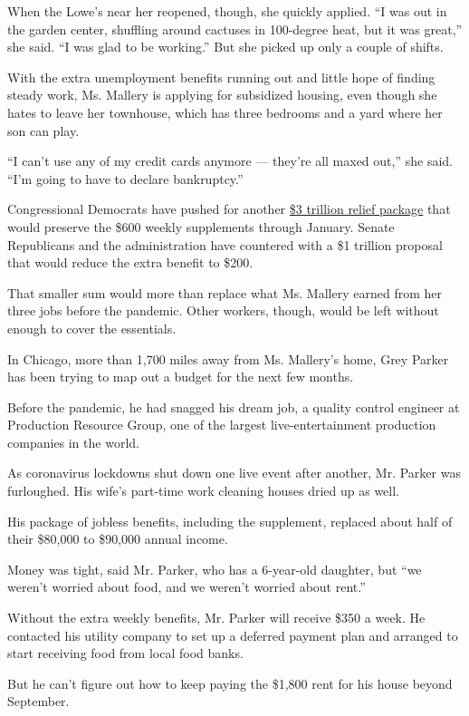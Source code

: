 When the Lowe's near her reopened, though, she quickly applied. ``I was
out in the garden center, shuffling around cactuses in 100-degree heat,
but it was great,'' she said. ``I was glad to be working.'' But she
picked up only a couple of shifts.

With the extra unemployment benefits running out and little hope of
finding steady work, Ms. Mallery is applying for subsidized housing,
even though she hates to leave her townhouse, which has three bedrooms
and a yard where her son can play.

``I can't use any of my credit cards anymore --- they're all maxed
out,'' she said. ``I'm going to have to declare bankruptcy.''

Congressional Democrats have pushed for another
\href{https://www.nytimes3xbfgragh.onion/2020/07/28/us/politics/coronavirus-relief-bills-house-senate.html}{\$3
trillion relief package} that would preserve the \$600 weekly
supplements through January. Senate Republicans and the administration
have countered with a \$1 trillion proposal that would reduce the extra
benefit to \$200.

That smaller sum would more than replace what Ms. Mallery earned from
her three jobs before the pandemic. Other workers, though, would be left
without enough to cover the essentials.

In Chicago, more than 1,700 miles away from Ms. Mallery's home, Grey
Parker has been trying to map out a budget for the next few months.

Before the pandemic, he had snagged his dream job, a quality control
engineer at Production Resource Group, one of the largest
live-entertainment production companies in the world.

As coronavirus lockdowns shut down one live event after another, Mr.
Parker was furloughed. His wife's part-time work cleaning houses dried
up as well.

His package of jobless benefits, including the supplement, replaced
about half of their \$80,000 to \$90,000 annual income.

Money was tight, said Mr. Parker, who has a 6-year-old daughter, but
``we weren't worried about food, and we weren't worried about rent.''

Without the extra weekly benefits, Mr. Parker will receive \$350 a week.
He contacted his utility company to set up a deferred payment plan and
arranged to start receiving food from local food banks.

But he can't figure out how to keep paying the \$1,800 rent for his
house beyond September.

